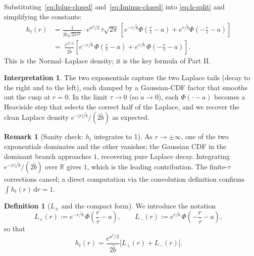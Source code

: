 \documentclass[11pt,a4paper,openany]{book}
\theoremstyle{plainserif}
\theoremstyle{definition}
\newtheorem{definition}[theorem]{Definition}
\theoremstyle{remarkstyle}
\newtheorem*{remark}{Remark}
\newtheorem*{interpretation}{Interpretation}
\newcommand{\R}{\mathbb{R}}
\newcommand{\btilde}{\tilde{b}}
\begin{document}
Substituting~\eqref{eq:Iplus-closed} and~\eqref{eq:Iminus-closed} into
\eqref{eq:h-split} and simplifying the constants:
\begin{align}
h_t(r) &= \frac{1}{2\btilde\sqrt{2\pi\tau^2}}\cdot
   e^{a^2/2}\,\tau\sqrt{2\pi}\,
   \left[ e^{-r/\btilde}\Phi\!\left(\frac{r}{\tau}-a\right)
        + e^{r/\btilde}\Phi\!\left(-\frac{r}{\tau}-a\right) \right] \nonumber\\
&= \boxed{\;\frac{e^{a^2/2}}{2\btilde}
   \left[ e^{-r/\btilde}\,\Phi\!\left(\frac{r}{\tau}-a\right)
        + e^{r/\btilde}\,\Phi\!\left(-\frac{r}{\tau}-a\right) \right].\;}
\label{eq:h-closed}
\end{align}
This is the Normal--Laplace density; it is the key formula of Part II.

\begin{interpretation}
The two exponentials capture the two Laplace tails (decay to the right
and to the left), each damped by a Gaussian-CDF factor that smooths out
the cusp at $r = 0$. In the limit $\tau \to 0$ (so $a\to 0$), each
$\Phi(\cdot - a)$ becomes a Heaviside step that selects the correct half
of the Laplace, and we recover the clean Laplace density
$e^{-|r|/\btilde}/(2\btilde)$ as expected.
\end{interpretation}

\begin{remark}[Sanity check: $h_t$ integrates to 1]
As $r\to\pm\infty$, one of the two exponentials dominates and the other
vanishes; the Gaussian CDF in the dominant branch approaches $1$,
recovering pure Laplace decay. Integrating $e^{-|r|/\btilde}/(2\btilde)$
over $\R$ gives $1$, which is the leading contribution. The finite-$\tau$
corrections cancel; a direct computation via the convolution definition
confirms $\int h_t(r)\,\mathrm{d}r = 1$.
\end{remark}

\begin{definition}[$L_\pm$ and the compact form]
\label{def:Lpm}
We introduce the notation
\begin{equation}
L_+(r) := e^{-r/\btilde}\, \Phi\!\left(\frac{r}{\tau}-a\right),\qquad
L_-(r) := e^{r/\btilde}\, \Phi\!\left(-\frac{r}{\tau}-a\right),
\label{eq:Lpm-def}
\end{equation}
so that
\begin{equation}
h_t(r) = \frac{e^{a^2/2}}{2\btilde}\bigl[L_+(r) + L_-(r)\bigr].
\label{eq:h-compact}
\end{equation}
\end{definition}
\end{document}
